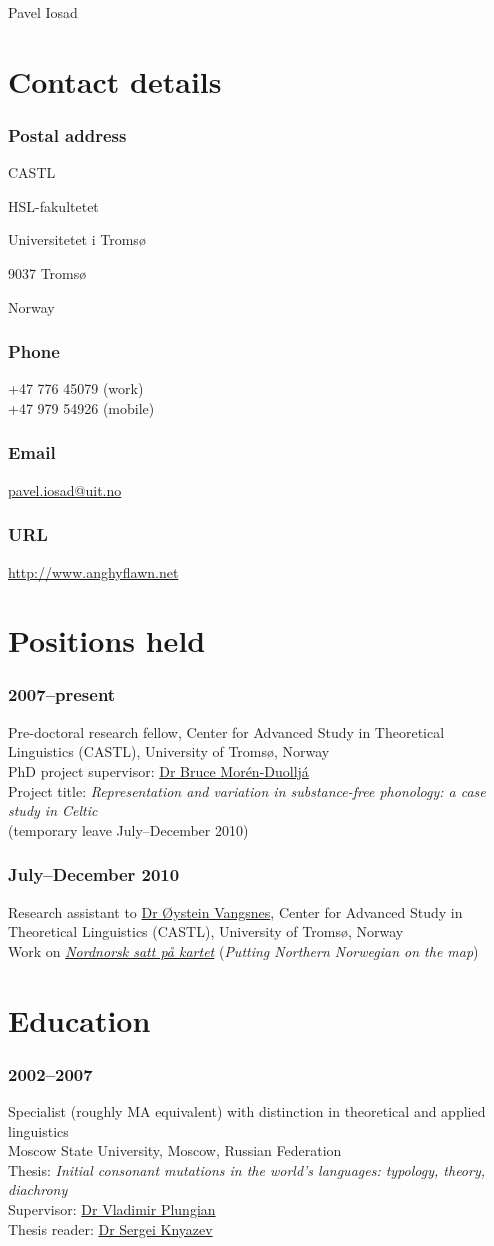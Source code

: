 \documentclass[a4paper,11pt]{article}
\newlength\blockwidth
\newcommand\cvitem[1]{\hspace*{\blockwidth}\begin{minipage}[t]{\linewidth-\blockwidth}
#1
\end{minipage}\par}
\newcommand{\block}[2]{\subsubsection{#1}\cvitem{#2}}
\begin{document}
\thispagestyle{plain}
{\Huge{} Pavel Iosad}\\[\baselineskip]

\section{Contact details}

\raggedcolumns

\begin{multicols}{2}
\block{Postal address}{CASTL\par
HSL-fakultetet\par
Universitetet i Tromsø\par
9037 Tromsø\par
Norway}
\block{Phone}{+47 776 45079 (work)\\
+47 979 54926 (mobile)}
\block{Email}{\href{mailto:pavel.iosad@uit.no}{pavel.iosad@uit.no}}
\block{URL}{\href{http://www.anghyflawn.net}{http://www.anghyflawn.net}}
\end{multicols}

\section{Positions held}
\block{2007--present}{Pre-doctoral research fellow, Center for Advanced Study in Theoretical Linguistics (CASTL), University of Troms\o, Norway\\
PhD project supervisor: \href{http://www.hum.uit.no/a/moren}{Dr Bruce Mor\'en-Duollj\'a}\\
Project title: \emph{Representation and variation in substance-free phonology: a case study in Celtic}\\
(temporary leave July--December 2010)
}

\block{July--December 2010}{Research assistant to \href{http://www.hum.uit.no/a/vangsnes}{Dr \O ystein Vangsnes}, Center for Advanced Study in Theoretical Linguistics (CASTL), University of Troms\o, Norway\\
Work on \href{http://nordnorsk.uit.no/}{\textit{Nordnorsk satt på kartet}} (\textit{Putting Northern Norwegian on the map})}

\section{Education}

\block{2002--2007}{Specialist (roughly MA equivalent) with distinction in theoretical and applied linguistics\\
Moscow State University, Moscow, Russian Federation\\
Thesis: \emph{Initial consonant mutations in the world's languages: typology,  theory, diachrony}\\
Supervisor: \href{http://www.philol.msu.ru/~otipl/new/main/people/plungian.php}{Dr Vladimir Plungian}\\
Thesis reader: \href{http://www.philol.msu.ru/~ruslang/about/employee/knyazev.s.v/}{Dr Sergei Knyazev}}
\end{document}
